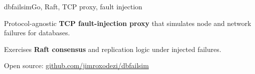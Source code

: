 \begin{cvproject}{dbfailsim}{Go, Raft, TCP proxy, fault injection}
  \item Protocol-agnostic \textbf{TCP fault-injection proxy} that simulates node and network failures for databases.
  \item Exercises \textbf{Raft consensus} and replication logic under injected failures.
  \item Open source: \href{https://github.com/jimroxodezi/dbfailsim}{github.com/jimroxodezi/dbfailsim}
\end{cvproject}
